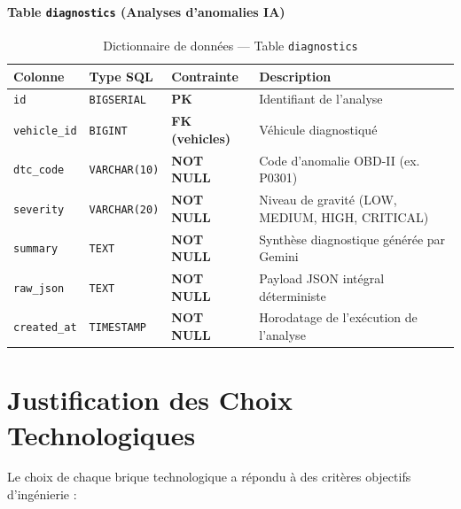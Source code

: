 \documentclass[12pt,a4paper,oneside]{report}
\begin{document}
\paragraph{Table \texttt{diagnostics} (Analyses d'anomalies IA)}
\begin{table}[H]
\centering
\small
\begin{tabularx}{\textwidth}{p{3cm} p{2.5cm} p{2cm} X}
\toprule
\textbf{Colonne} & \textbf{Type SQL} & \textbf{Contrainte} & \textbf{Description} \\
\midrule
\texttt{id} & \texttt{BIGSERIAL} & \textbf{PK} & Identifiant de l'analyse \\
\texttt{vehicle\_id} & \texttt{BIGINT} & \textbf{FK (vehicles)} & V\'ehicule diagnostiqu\'e \\
\texttt{dtc\_code} & \texttt{VARCHAR(10)} & \textbf{NOT NULL} & Code d'anomalie OBD-II (ex. P0301) \\
\texttt{severity} & \texttt{VARCHAR(20)} & \textbf{NOT NULL} & Niveau de gravit\'e (LOW, MEDIUM, HIGH, CRITICAL) \\
\texttt{summary} & \texttt{TEXT} & \textbf{NOT NULL} & Synth\`ese diagnostique g\'en\'er\'ee par Gemini \\
\texttt{raw\_json} & \texttt{TEXT} & \textbf{NOT NULL} & Payload JSON int\'egral d\'eterministe \\
\texttt{created\_at} & \texttt{TIMESTAMP} & \textbf{NOT NULL} & Horodatage de l'ex\'ecution de l'analyse \\
\bottomrule
\end{tabularx}
\caption{Dictionnaire de donn\'ees --- Table \texttt{diagnostics}}
\end{table}

\section{Justification des Choix Technologiques}
Le choix de chaque brique technologique a r\'epondu \`a des crit\`eres objectifs d'ing\'enierie :
\end{document}
